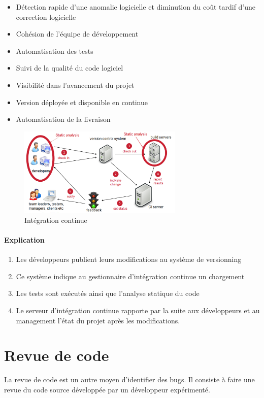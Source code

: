 \begin{itemize}
\item Détection rapide d'une anomalie logicielle et diminution du coût tardif d'une correction logicielle
\item Cohésion de l'équipe de développement
\item Automatisation des tests
\item Suivi de la qualité du code logiciel
\item Visibilité dans l'avancement du projet
\item Version déployée et disponible en continue
\item Automatisation de la livraison
\end{itemize}

\begin{figure}[h!]
\centering
\includegraphics[width=0.7\textwidth]{assets/ci.png}
\caption{Intégration continue}
\label{fig:my_label}
\end{figure}

\paragraph{Explication}
\begin{enumerate}
\item Les développeurs publient leurs modifications au système de versionning
\item Ce système indique au gestionnaire d'intégration continue un chargement
\item Les tests sont exécutés ainsi que l'analyse statique du code
\item Le serveur d'intégration continue rapporte par la suite aux développeurs et au management l'état du projet après les modifications.
\end{enumerate}

\section{Revue de code}
La revue de code est un autre moyen d'identifier des bugs. 
Il consiste à faire une revue du code source développée par un développeur expérimenté. 

